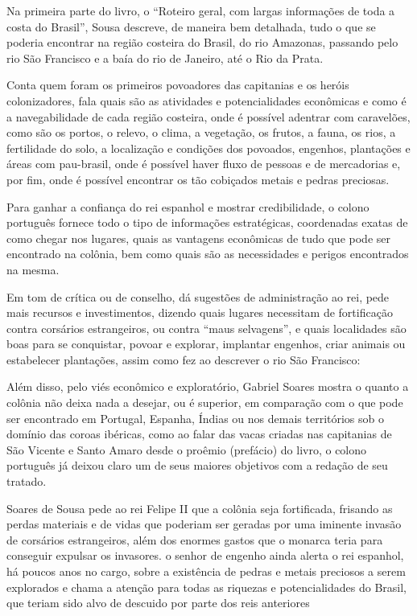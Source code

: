 \documentclass[12pt]{extarticle}
\begin{document}
Na primeira parte do livro, o ``Roteiro geral, com largas informações de toda a costa do Brasil'', Sousa descreve, de maneira bem detalhada, tudo o que se poderia encontrar na região costeira do Brasil, do rio Amazonas, passando pelo rio São Francisco e a baía do rio de Janeiro, até o Rio da Prata.

Conta quem foram os primeiros povoadores das capitanias e os heróis colonizadores, fala quais são as atividades e potencialidades econômicas e como é a navegabilidade de cada região costeira, onde é possível adentrar com caravelões, como são os portos, o relevo, o clima, a vegetação, os frutos, a fauna, os rios, a fertilidade do solo, a localização e condições dos povoados, engenhos, plantações e áreas com pau-brasil, onde é possível haver fluxo de pessoas e de mercadorias e, por fim, onde é possível encontrar os tão cobiçados metais e pedras preciosas.

Para ganhar a confiança do rei espanhol e mostrar credibilidade, o colono português fornece todo o tipo de informações estratégicas, coordenadas exatas de como chegar nos lugares, quais as vantagens econômicas de tudo que pode ser encontrado na colônia, bem como quais são as necessidades e perigos encontrados na mesma.

Em tom de crítica ou de conselho, dá sugestões de administração ao rei, pede mais recursos e investimentos, dizendo quais lugares necessitam de fortificação contra corsários estrangeiros, ou contra “maus selvagens”, e quais localidades são boas para se conquistar, povoar e explorar, implantar engenhos, criar animais ou estabelecer plantações, assim como fez ao descrever o rio São Francisco:

Além disso, pelo viés econômico e exploratório, Gabriel Soares mostra o quanto a colônia não deixa nada a desejar, ou é superior, em comparação com o que pode ser encontrado em Portugal, Espanha, Índias ou nos demais territórios sob o domínio das coroas ibéricas, como ao falar das vacas criadas nas capitanias de São Vicente e Santo Amaro
desde o proêmio (prefácio) do livro, o colono português já deixou claro um de seus maiores objetivos com a redação de seu tratado.

Soares de Sousa pede ao rei Felipe II que a colônia seja fortificada, frisando as perdas materiais e de vidas que poderiam ser geradas por uma iminente invasão de corsários estrangeiros, além dos enormes gastos que o monarca teria para conseguir expulsar os invasores.
o senhor de engenho ainda alerta o rei espanhol, há poucos anos no cargo, sobre a existência de pedras e metais preciosos a serem explorados e chama a atenção para todas as riquezas e potencialidades do Brasil, que teriam sido alvo de descuido por parte dos reis anteriores
\end{document}
